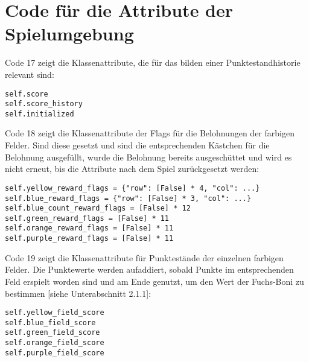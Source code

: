 \section{Code für die Attribute der Spielumgebung}
\begin{minipage}{\linewidth}
Code 17 zeigt die Klassenattribute, die für das bilden einer Punktestandhistorie relevant sind:
\vspace{0.5cm}
\begin{lstlisting}[caption={Klassenattribute für die Nachvollziehbarkeit von Punkteständen}, basicstyle=\ttfamily]
self.score
self.score_history
self.initialized
\end{lstlisting}
\end{minipage}

\begin{minipage}{\linewidth}
Code 18 zeigt die Klassenattribute der Flags für die Belohnungen der farbigen Felder. Sind diese gesetzt und sind die entsprechenden Kästchen für die Belohnung ausgefüllt, wurde die Belohnung bereits ausgeschüttet und wird es nicht erneut, bis die Attribute nach dem Spiel zurückgesetzt werden:
\vspace{0.5cm}
\begin{lstlisting}[caption={Klassenattribute für Belohnungsflags}, basicstyle=\ttfamily]
self.yellow_reward_flags = {"row": [False] * 4, "col": ...}
self.blue_reward_flags = {"row": [False] * 3, "col": ...}
self.blue_count_reward_flags = [False] * 12
self.green_reward_flags = [False] * 11
self.orange_reward_flags = [False] * 11
self.purple_reward_flags = [False] * 11
\end{lstlisting}
\end{minipage}

\begin{minipage}{\linewidth}
Code 19 zeigt die Klassenattribute für Punktestände der einzelnen farbigen Felder. Die Punktewerte werden aufaddiert, sobald Punkte im entsprechenden Feld erspielt worden sind und am Ende genutzt, um den Wert der Fuchs-Boni zu bestimmen [siehe Unterabschnitt 2.1.1]:
\vspace{0.5cm}
\begin{lstlisting}[caption={Klassenattribute für erreichte Punktestände der einzelnen farbigen Felder}, basicstyle=\ttfamily]
self.yellow_field_score
self.blue_field_score
self.green_field_score
self.orange_field_score
self.purple_field_score
\end{lstlisting}
\end{minipage}


